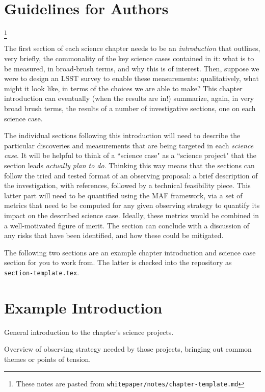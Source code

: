 
\section{Guidelines for Authors}
\def\secname{guidelines}\label{sec:\secname}

\footnote{These notes are pasted from
  \texttt{whitepaper/notes/chapter-template.md}
}

The first section of each science chapter needs to be an {\it introduction}
that outlines, very briefly, the commonality of the key science cases
contained in it:  what is to be measured, in broad-brush terms, and
why this is of interest. Then, suppose we were to design an LSST
survey to enable these measurements: qualitatively, what might it look
like, in terms of the choices we are able to make? This chapter
introduction can eventually (when the results are in!) summarize,
again, in very broad brush terms, the results of a number of
investigative sections, one on each science case.

The individual sections following this introduction will need to
describe the particular discoveries and measurements that are being
targeted in each {\it science case}. It will be helpful to think of a
``science case" as a ``science project" that the section leads {\it
actually plan to do}. Thinking this way means that the sections can
follow the tried and tested format of an observing proposal: a brief
description of the investigation, with references, followed by a
technical feasibility piece.  This latter part will need to be
quantified using the MAF framework, via a set of metrics that need to
be computed for any given observing strategy to quantify its impact on
the described science case. Ideally, these metrics would be combined
in a well-motivated figure of merit. The section can conclude with a
discussion of any risks that have been identified, and how these could
be mitigated.

The following two sections are an example chapter introduction and
science case section for you to work from. The latter is checked into
the repository as \texttt{section-template.tex}.


\section{Example Introduction}

General introduction to the chapter's science projects.

Overview of observing strategy needed by those projects, bringing
out common themes or points of tension.




